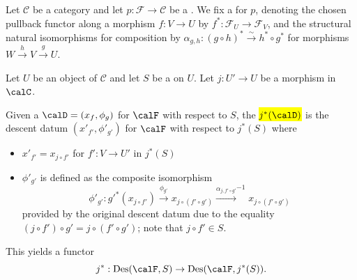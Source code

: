 \begin{definition} \label{definition:pullback_of_a_descent_datum_for_a_category_fibered_in_groupoids_over_a_category_with_respect_to_a_sieve_via_a_morphism_in_the_base_category}
Let $\mathcal{C}$ be a category and let $p: \mathcal{F} \to \mathcal{C}$ be a . We fix a  for $p$, denoting the chosen pullback functor along a morphism $f: V \to U$ by $f^*: \mathcal{F}_U \to \mathcal{F}_V$, and the structural natural isomorphisms for composition by $\alpha_{g,h}: (g \circ h)^* \xrightarrow{\sim} h^* \circ g^*$ for morphisms $W \xrightarrow{h} V \xrightarrow{g} U$.

Let $U$ be an object of $\mathcal{C}$ and let $S$ be a  on $U$. Let $j: U' \to U$ be a morphism in $\calC$.

Given a  $\calD = (x_f, \phi_g)$ for $\calF$ with respect to $S$, the  \hl{$j^*(\calD)$} is the descent datum $(x'_{f'}, \phi'_{g'})$ for $\calF$ with respect to $j^*(S)$ where
\begin{itemize}
    \item $x'_{f'} = x_{j \circ f'}$ for $f': V \to U'$ in $j^*(S)$
    \item $\phi'_{g'}$ is defined as the composite isomorphism
    $$\phi'_{g'} : {g'}^* (x_{j \circ f'}) \xrightarrow{\phi_{g'}} x_{j \circ (f' \circ g')} \xrightarrow{\alpha_{j, f' \circ g'}}^{-1} x_{j \circ (f' \circ g')}$$
    provided by the original descent datum due to the equality $(j \circ f') \circ g' = j \circ (f' \circ g')$; note that $j \circ f' \in S$. 
\end{itemize}

This yields a functor 
$$j^*:\operatorname{Des}(\calF, S) \to \operatorname{Des}(\calF, j^*(S)).$$
\end{definition}